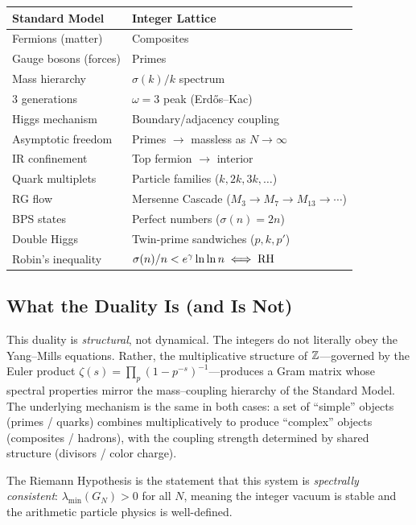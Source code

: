 \documentclass[11pt,a4paper]{article}
\begin{document}
\begin{center}
\begin{tabular}{@{}ll@{}}
\toprule
\textbf{Standard Model} & \textbf{Integer Lattice} \\
\midrule
Fermions (matter) & Composites \\
Gauge bosons (forces) & Primes \\
Mass hierarchy & $\sigma(k)/k$ spectrum \\
3 generations & $\omega = 3$ peak (Erd\H{o}s--Kac) \\
Higgs mechanism & Boundary/adjacency coupling \\
Asymptotic freedom & Primes $\to$ massless as $N \to \infty$ \\
IR confinement & Top fermion $\to$ interior \\
Quark multiplets & Particle families ($k, 2k, 3k, \ldots$) \\
RG flow & Mersenne Cascade ($M_3 \to M_7 \to M_{13} \to \cdots$) \\
BPS states & Perfect numbers ($\sigma(n) = 2n$) \\
Double Higgs & Twin-prime sandwiches ($p, k, p'$) \\
Robin's inequality & $\sigma(n)/n < e^\gamma \ln\ln n \iff \mathrm{RH}$ \\
\bottomrule
\end{tabular}
\end{center}

\subsection{What the Duality Is (and Is Not)}

This duality is \emph{structural}, not dynamical. The integers do not
literally obey the Yang--Mills equations. Rather, the multiplicative
structure of $\mathbb{Z}$---governed by the Euler product
$\zeta(s) = \prod_p (1 - p^{-s})^{-1}$---produces a Gram matrix whose
spectral properties mirror the mass--coupling hierarchy of the Standard
Model. The underlying mechanism is the same in both cases: a set of
``simple'' objects (primes / quarks) combines multiplicatively to produce
``complex'' objects (composites / hadrons), with the coupling strength
determined by shared structure (divisors / color charge).

The Riemann Hypothesis is the statement that this system is
\emph{spectrally consistent}: $\lambda_{\min}(G_N) > 0$ for all $N$,
meaning the integer vacuum is stable and the arithmetic particle physics
is well-defined.
\end{document}

